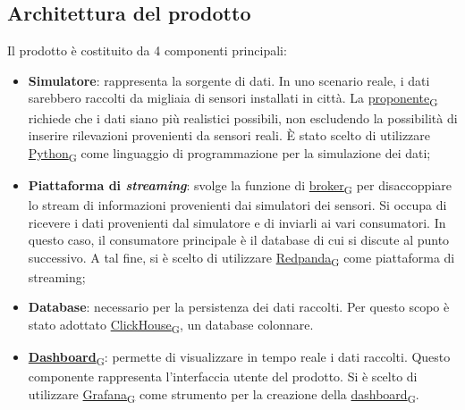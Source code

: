 \subsection{Architettura del prodotto}
Il prodotto è costituito da 4 componenti principali:
\begin{itemize}
	\item \textbf{Simulatore}: rappresenta la sorgente di dati. In uno scenario reale, i dati sarebbero raccolti da migliaia di sensori
	      installati in città. La \href{https://7last.github.io/docs/rtb/documentazione-interna/glossario\#proponente}{proponente\textsubscript{G}} richiede che i dati siano più realistici possibili, non escludendo la possibilità di inserire rilevazioni provenienti da sensori reali.
	      È stato scelto di utilizzare \href{https://7last.github.io/docs/rtb/documentazione-interna/glossario\#python}{Python\textsubscript{G}} come linguaggio di programmazione per la simulazione dei dati;
	\item \textbf{Piattaforma di \textit{streaming}}: svolge la funzione di \href{https://7last.github.io/docs/rtb/documentazione-interna/glossario\#broker}{broker\textsubscript{G}} per disaccoppiare lo stream di informazioni provenienti dai simulatori dei sensori.
	      Si occupa di ricevere i dati provenienti dal simulatore e di inviarli ai vari consumatori. In questo caso, il consumatore principale è il database
	      di cui si discute al punto successivo.
	      A tal fine, si è scelto di utilizzare \href{https://7last.github.io/docs/rtb/documentazione-interna/glossario\#Redpanda}{Redpanda\textsubscript{G}} come piattaforma di streaming; 
	\item \textbf{Database}: necessario per la persistenza dei dati raccolti. Per questo scopo è stato adottato \href{https://7last.github.io/docs/rtb/documentazione-interna/glossario\#clickhouse}{ClickHouse\textsubscript{G}}, un database colonnare.
	\item \href{https://7last.github.io/docs/rtb/documentazione-interna/glossario\#dashboard}{\textbf{Dashboard}\textsubscript{G}}: permette di visualizzare in tempo reale i dati raccolti. Questo componente rappresenta l'interfaccia utente del prodotto.
	      Si è scelto di utilizzare \href{https://7last.github.io/docs/rtb/documentazione-interna/glossario\#grafana}{Grafana\textsubscript{G}} come strumento per la creazione della \href{https://7last.github.io/docs/rtb/documentazione-interna/glossario\#dashboard}{dashboard\textsubscript{G}}.
\end{itemize}


